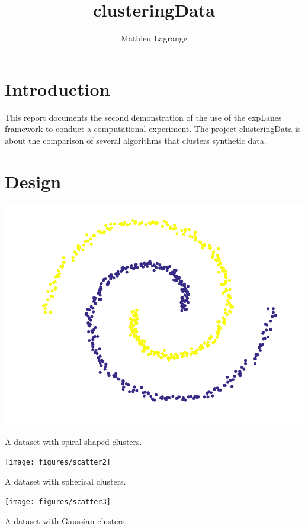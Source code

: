 \documentclass[12pt,a4paper,fleqn]{tufte-handout}
\title[clustering]{clusteringData}
\author{ Mathieu Lagrange }
\begin{document}
 
  
\maketitle 
  
\section{Introduction}


This report documents the second demonstration of the use of the expLanes framework to conduct a computational experiment. The project clusteringData is about the comparison of several algorithms that clusters synthetic data.

\section{Design}

\begin{marginfigure}
\includegraphics[width=\textwidth]{figures/scatter1}
\caption{A dataset with spiral shaped clusters.}
\label{scatter}
\end{marginfigure}

\begin{marginfigure}
\texttt{[image: figures/scatter2]}
\caption{A dataset with spherical clusters.}
\label{scatter}
\end{marginfigure}

\begin{marginfigure}
\texttt{[image: figures/scatter3]}
\caption{A dataset with Gaussian clusters.}
\label{scatter}
\end{marginfigure}
\end{document}
